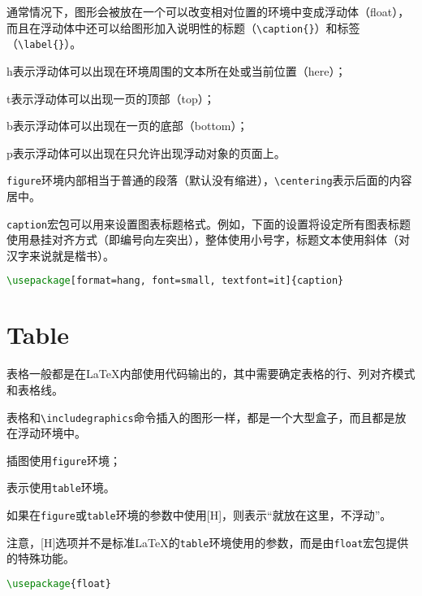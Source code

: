 通常情况下，图形会被放在一个可以改变相对位置的环境中变成浮动体（float），而且在浮动体中还可以给图形加入说明性的标题（\texttt{\textbackslash caption\{\}}）和标签（\texttt{\textbackslash label\{\}}）。

\begin{compactitem}
\item h表示浮动体可以出现在环境周围的文本所在处或当前位置（here）；
\item t表示浮动体可以出现一页的顶部（top）；
\item b表示浮动体可以出现在一页的底部（bottom）；
\item p表示浮动体可以出现在只允许出现浮动对象的页面上。
\end{compactitem}

\texttt{figure}环境内部相当于普通的段落（默认没有缩进），\texttt{\textbackslash centering}表示后面的内容居中。


\texttt{caption}宏包可以用来设置图表标题格式。例如，下面的设置将设定所有图表标题使用悬挂对齐方式（即编号向左突出），整体使用小号字，标题文本使用斜体（对汉字来说就是楷书）。


\begin{lstlisting}[language=TeX]
\usepackage[format=hang, font=small, textfont=it]{caption}
\end{lstlisting}



\chapter{Table}


表格一般都是在\LaTeX 内部使用代码输出的，其中需要确定表格的行、列对齐模式和表格线。

表格和\texttt{\textbackslash includegraphics}命令插入的图形一样，都是一个大型盒子，而且都是放在浮动环境中。


\begin{compactitem}
\item 插图使用\texttt{figure}环境；
\item 表示使用\texttt{table}环境。
\end{compactitem}


如果在\texttt{figure}或\texttt{table}环境的参数中使用[H]，则表示“就放在这里，不浮动”。

注意，[H]选项并不是标准\LaTeX 的\texttt{table}环境使用的参数，而是由\texttt{float}宏包提供的特殊功能。


\begin{lstlisting}[language=TeX]
\usepackage{float}
\end{lstlisting}


